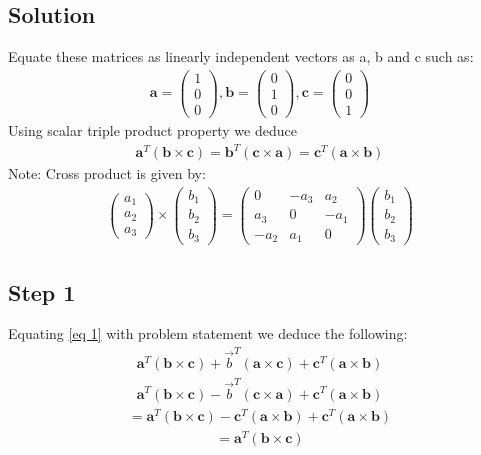 \documentclass[journal,12pt,twocolumn]{IEEEtran}
\providecommand{\brak}[1]{\ensuremath{\left(#1\right)}}
\newcommand{\myvec}[1]{\ensuremath{\begin{pmatrix}#1\end{pmatrix}}}
\let\vec\mathbf
\begin{document}
\subsection{Solution}
Equate these matrices as linearly independent vectors as a, b and c such as:
\begin{align}
\label{eq 1}
\vec{a}=\myvec{1\\0\\0}, 
\vec{b}=\myvec{0\\1\\0}, 
\vec{c}=\myvec{0\\0\\1}
\end{align}
Using scalar triple product property we deduce
\begin{align}
\vec{a}^{T}
\brak{
\vec{b}\times
\vec{c}
}=
\vec{b}^{T}
\brak{
\vec{c}\times
\vec{a}
}=
\vec{c}^{T}
\brak{
\vec{a}\times
\vec{b}
}
\end{align}
Note: Cross product is given by:
\begin{align}
\label{eq 3}
\myvec{a_1\\a_2\\a_3}\times
\myvec{b_1\\b_2\\b_3}=
\myvec{0&-a_3&a_2\\a_3&0&-a_1\\-a_2&a_1&0}
\myvec{b_1\\b_2\\b_3}
\end{align}
\subsection{Step 1}
Equating \eqref{eq 1} with problem statement we deduce the following:
\begin{align}
\vec{a}^T
\brak{
\vec{b}\times
\vec{c}
}+
\Vec{b}^T
\brak{
\vec{a}\times
\vec{c}
}+
\vec{c}^T
\brak{
\vec{a}\times
\vec{b}
}
\end{align}
\begin{align}
\vec{a}^T
\brak{
\vec{b}\times
\vec{c}
}-
\Vec{b}^T
\brak{
\vec{c}\times
\vec{a}
}+
\vec{c}^T
\brak{
\vec{a}\times
\vec{b}
}
\end{align}
\begin{align}
=\vec{a}^{T}
\brak{
\vec{b}\times
\vec{c}
}-
\vec{c}^T
\brak{
\vec{a}\times
\vec{b}
}+
\vec{c}^{T}
\brak{
\vec{a}\times
\vec{b}
}
\end{align}
\begin{align}
\label{eq 7}
=\vec{a}^{T}
\brak{
\vec{b}\times
\vec{c}
}
\end{align}
\end{document}
